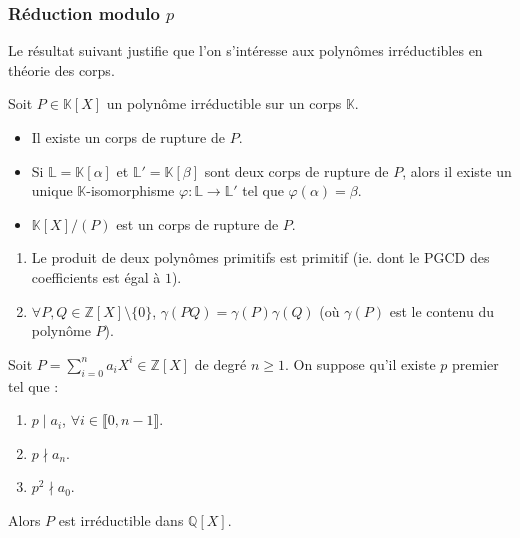   \subsubsection{Réduction modulo \texorpdfstring{$p$}{p}}

  Le résultat suivant justifie que l'on s'intéresse aux polynômes irréductibles en théorie des corps.


  \begin{theorem}
    Soit $P \in \mathbb{K}[X]$ un polynôme irréductible sur un corps $\mathbb{K}$.
    \begin{itemize}
      \item Il existe un corps de rupture de $P$.
      \item Si $\mathbb{L} = \mathbb{K}[\alpha]$ et $\mathbb{L}' = \mathbb{K}[\beta]$ sont deux corps de rupture de $P$, alors il existe un unique $\mathbb{K}$-isomorphisme $\varphi : \mathbb{L} \rightarrow \mathbb{L}'$ tel que $\varphi(\alpha) = \beta$.
      \item $\mathbb{K}[X]/(P)$ est un corps de rupture de $P$.
    \end{itemize}
  \end{theorem}


  \begin{lemma}
    \begin{enumerate}[label={\bfseries(\roman*)}]
      \item Le produit de deux polynômes primitifs est primitif (ie. dont le PGCD des coefficients est égal à $1$).
      \item $\forall P, Q \in \mathbb{Z}[X] \setminus \{ 0 \}$, $\gamma(PQ) = \gamma(P) \gamma(Q)$ (où $\gamma(P)$ est le contenu du polynôme $P$).
    \end{enumerate}
  \end{lemma}


  \begin{theorem}
    Soit $P = \sum_{i=0}^n a_i X^i \in \mathbb{Z}[X]$ de degré $n \geq 1$. On suppose qu'il existe $p$ premier tel que :
    \begin{enumerate}[label={\bfseries(\roman*)}]
      \item $p \mid a_i$, $\forall i \in \llbracket 0, n-1 \rrbracket$.
      \item $p \nmid a_n$.
      \item $p^2 \nmid a_0$.
    \end{enumerate}
    Alors $P$ est irréductible dans $\mathbb{Q}[X]$.
  \end{theorem}

